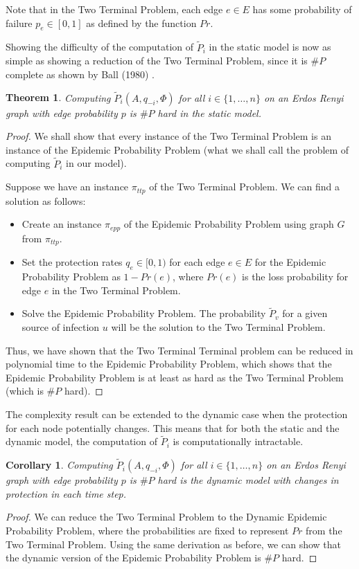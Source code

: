\documentclass{article}
\theoremstyle{plain}
\newtheorem{theorem}{Theorem}
\newtheorem{corollary}{Corollary}
\begin{document}
Note that in the Two Terminal Problem, each edge $e \in E$ has some probability of failure $p_e \in [0,1]$ as defined by the function $Pr$.

Showing the difficulty of the computation of $\tilde{P}_i$ in the static model is now as simple as showing a reduction of the Two Terminal Problem, since it is $\# P$ complete as shown by Ball (1980) \cite{ball80}.

\begin{theorem}
  Computing $\tilde{P}_i(A, q_{-i}, \Phi)$ for all $i \in \{1, \ldots, n\}$ on an Erdos Renyi graph with edge probability $p$ is $\# P$ hard in the static model.
\end{theorem}
\begin{proof}
  We shall show that every instance of the Two Terminal Problem is an instance of the Epidemic Probability Problem (what we shall call the problem of computing $\tilde{P}_i$ in our model).

  Suppose we have an instance $\pi_{ttp}$ of the Two Terminal Problem. We can find a solution as follows:
  \begin{itemize}
    \item Create an instance $\pi_{epp}$ of the Epidemic Probability Problem using graph $G$ from $\pi_{ttp}$.
    \item Set the protection rates $q_e \in [0,1)$ for each edge $e \in E$ for the Epidemic Probability Problem as $1 - Pr(e)$, where $Pr(e)$ is the loss probability for edge $e$ in the Two Terminal Problem.
    \item Solve the Epidemic Probability Problem. The probability $\tilde{P}_v$ for a given source of infection $u$ will be the solution to the Two Terminal Problem.
  \end{itemize}

  Thus, we have shown that the Two Terminal Terminal problem can be reduced in polynomial time to the Epidemic Probability Problem, which shows that the Epidemic Probability Problem is at least as hard as the Two Terminal Problem (which is $\# P$ hard).
\end{proof}

The complexity result can be extended to the dynamic case when the protection for each node potentially changes. This means that for both the static and the dynamic model, the computation of $\tilde{P}_i$ is computationally intractable.

\begin{corollary}
  Computing $\tilde{P}_i(A, q_{-i}, \Phi)$ for all $i \in \{1, \ldots, n\}$ on an Erdos Renyi graph with edge probability $p$ is $\# P$ hard is the dynamic model with changes in protection in each time step.
\end{corollary}
\begin{proof}
  We can reduce the Two Terminal Problem to the Dynamic Epidemic Probability Problem, where the probabilities are fixed to represent $Pr$ from the Two Terminal Problem. Using the same derivation as before, we can show that the dynamic version of the Epidemic Probability Problem is $\# P$ hard.
\end{proof}
\end{document}
